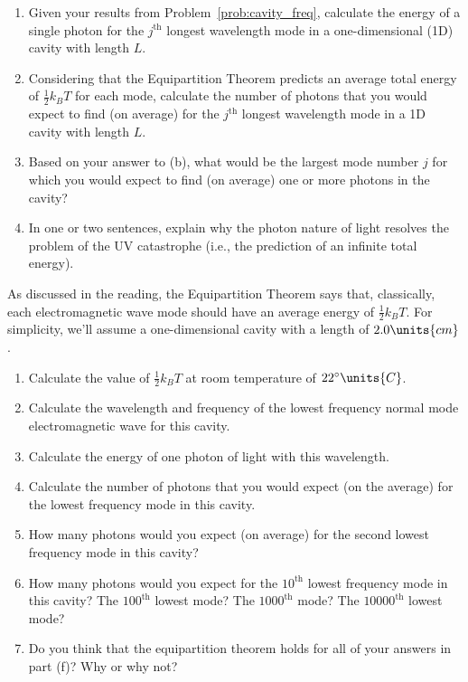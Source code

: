 \begin{problem}
\begin{enumerate}
\item Given your results from Problem~\ref{prob:cavity_freq},
calculate the energy of a single photon for the $j^\text{th}$ longest 
wavelength mode in a one-dimensional (1D) cavity with length $L$.
\item Considering that the Equipartition Theorem predicts an average
total energy of $\textstyle{\frac{1}{2}}k_BT$ for each mode, calculate
the number of photons that you would expect to find (on average)
for the $j^\text{th}$ longest wavelength mode in a 1D cavity with length $L$.
\item Based on your answer to (b), what would be the largest mode
number $j$ for which you would expect to find (on average) one or more
photons in the cavity?
\item In one or two sentences, explain why the photon nature of light
resolves the problem of the UV catastrophe (i.e., the prediction of
an infinite total energy). 
\end{enumerate}
\label{prob:largest_mode}
\end{problem}

\begin{problem}
As discussed in the reading, the Equipartition Theorem says that, classically,
each electromagnetic wave mode should have an average energy of
$\textstyle{\frac{1}{2}}k_BT$. For simplicity, we'll assume a one-dimensional cavity
with a length of $2.0\units{cm}$.
\begin{enumerate}
\item Calculate the value of $\textstyle{\frac{1}{2}}k_BT$ at
room temperature of $22^{\circ}\units{C}$.
\item Calculate the wavelength and frequency of the lowest frequency
normal mode electromagnetic wave for this cavity.
\item Calculate the energy of one photon of light with this
wavelength.
\item Calculate the number of photons that you would expect (on the
average) for the lowest frequency mode in this cavity.
\item How many photons would you expect (on average) for the
second lowest frequency mode in this cavity?
\item How many photons would you expect for the $10^\text{th}$ lowest
frequency mode in this cavity? The $100^\text{th}$ lowest mode? The
$1000^\text{th}$ mode? The $10000^\text{th}$ lowest mode?
\item Do you think that the equipartition theorem holds for all of your
answers in part (f)? Why or why not?
\end{enumerate}
\end{problem}

